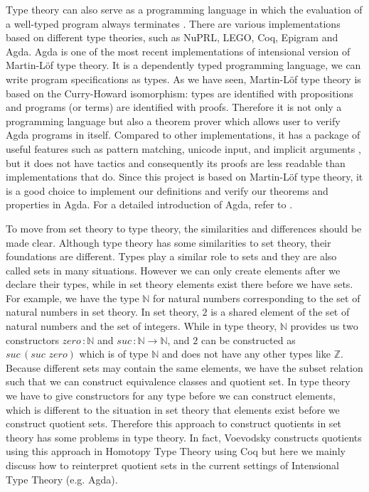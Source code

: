 \documentclass{article}
\theoremstyle{definition}
\newcommand{\todo}[1]{\textcolor{red}{TO~DO:~#1}}
\newcommand{\N}{\mathbb{N}}
\newcommand{\Z}{\mathbb{Z}}
\newcommand{\itt}{Intensional Type Theory}
\newcommand{\mltt}{Martin-L\"{o}f type theory}
\begin{document}
Type theory can also serve as a programming language in
which the evaluation of a well-typed program always terminates
\cite{nor:90}. 
There are various implementations based on different type theories, such as
NuPRL, LEGO, Coq, Epigram and Agda.
Agda is one of the most recent implementations of intensional version
of \mltt{}. 
It is a dependently typed programming language, we can write program specifications as
types. 
As we have seen, \mltt{} is based on the Curry-Howard
isomorphism: types are identified with propositions and programs (or
terms) are identified with proofs. 
Therefore it is not only a programming language but also a
theorem prover which allows user to verify Agda programs in
itself. 
Compared to other implementations, it has a package of useful
features such as pattern matching, unicode input, and implicit
arguments \cite{bov:09}, but it does not have tactics and consequently
its proofs are less readable than implementations that do. Since this project is based on \mltt{}, it is a good choice to implement our definitions
and verify our theorems and properties in Agda.  For a detailed
introduction of Agda, refer to \cite{norell:09}.

To move from set theory to type theory, the similarities and differences should be made clear. Although type theory has some similarities to set theory, their foundations are different. Types play a similar role to sets and they are
also called sets in many situations. However we can only create
elements after we declare their types, while in set theory elements exist there before
we have sets. For example,
we have the type $\N$ for natural numbers corresponding to the set of
natural numbers in set theory. In set theory, $2$ is a shared element
of the set of natural numbers and the set of integers. While in type
theory, $\N$ provides us two constructors
$zero \,\colon\N$ and $suc\,\colon\N\to\N$, and $2$ can be constructed
as $suc\,(suc\,\,zero)$ which is of type $\N$ and does not have any other
types like $\Z$. Because different sets may contain the same elements, we
have the subset relation such that we can construct equivalence
classes and quotient set. 
In type theory we have to give constructors for any type before we can construct elements, which is different to the situation in set theory that
elements exist before we construct quotient sets. Therefore this approach to construct quotients in set
theory has some problems in type theory. In fact, Voevodsky constructs
quotients using this approach in Homotopy Type Theory using Coq
\cite{voe:hset} but here we
mainly discuss how to reinterpret quotient sets in the current settings of \itt{} (e.g. Agda).
\end{document}
